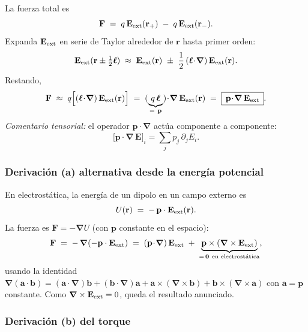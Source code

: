 \documentclass{article}
\begin{document}
La fuerza total es
\[
\mathbf F \;=\; q\,\mathbf E_{\rm ext}(\mathbf r_{+}) \;-\; q\,\mathbf E_{\rm ext}(\mathbf r_{-}).
\]
Expanda $\mathbf E_{\rm ext}$ en serie de Taylor alrededor de $\mathbf r$ hasta primer orden:
\[
\mathbf E_{\rm ext}(\mathbf r\pm\tfrac{1}{2}\boldsymbol{\ell})
\;\approx\; \mathbf E_{\rm ext}(\mathbf r)\ \pm\ \frac{1}{2}\,(\boldsymbol{\ell}\!\cdot\!\boldsymbol{\nabla})\,\mathbf E_{\rm ext}(\mathbf r).
\]
Restando,
\[
\mathbf F \;\approx\; q\Big[(\boldsymbol{\ell}\!\cdot\!\boldsymbol{\nabla})\,\mathbf E_{\rm ext}(\mathbf r)\Big]
\;=\; (\underbrace{q\,\boldsymbol{\ell}}_{=\ \mathbf p})\!\cdot\!\boldsymbol{\nabla}\,\mathbf E_{\rm ext}(\mathbf r)
\;=\; \boxed{\,\mathbf p\!\cdot\!\boldsymbol{\nabla}\,\mathbf E_{\rm ext}\,}.
\]
\emph{Comentario tensorial:} el operador $\mathbf p\!\cdot\!\boldsymbol{\nabla}$ actúa componente a componente:
\[
\big[\mathbf p\!\cdot\!\boldsymbol{\nabla}\,\mathbf E\big]_i
=\sum_{j} p_j\,\partial_j E_i.
\]

\subsubsection*{Derivación (a) alternativa desde la energía potencial}
En electrostática, la energía de un dipolo en un campo externo es
\[
U(\mathbf r) \;=\; -\,\mathbf p\cdot\mathbf E_{\rm ext}(\mathbf r).
\]
La fuerza es $\mathbf F=-\boldsymbol{\nabla}U$ (con $\mathbf p$ constante en el espacio):
\[
\mathbf F \;=\; -\,\boldsymbol{\nabla}\!\left(-\mathbf p\cdot\mathbf E_{\rm ext}\right)
\;=\; (\mathbf p\!\cdot\!\boldsymbol{\nabla})\,\mathbf E_{\rm ext}
\;+\; \underbrace{\mathbf p\times(\boldsymbol{\nabla}\times\mathbf E_{\rm ext})}_{=\,\mathbf 0\ \text{en electrostática}},
\]
usando la identidad $\boldsymbol{\nabla}(\mathbf a\!\cdot\!\mathbf b)=
(\mathbf a\!\cdot\!\boldsymbol{\nabla})\mathbf b+(\mathbf b\!\cdot\!\boldsymbol{\nabla})\mathbf a+\mathbf a\times(\boldsymbol{\nabla}\times\mathbf b)+\mathbf b\times(\boldsymbol{\nabla}\times\mathbf a)$ con $\mathbf a=\mathbf p$ constante. Como $\boldsymbol{\nabla}\times\mathbf E_{\rm ext}=0$, queda el resultado anunciado.

\subsubsection*{Derivación (b) del torque}
\end{document}
